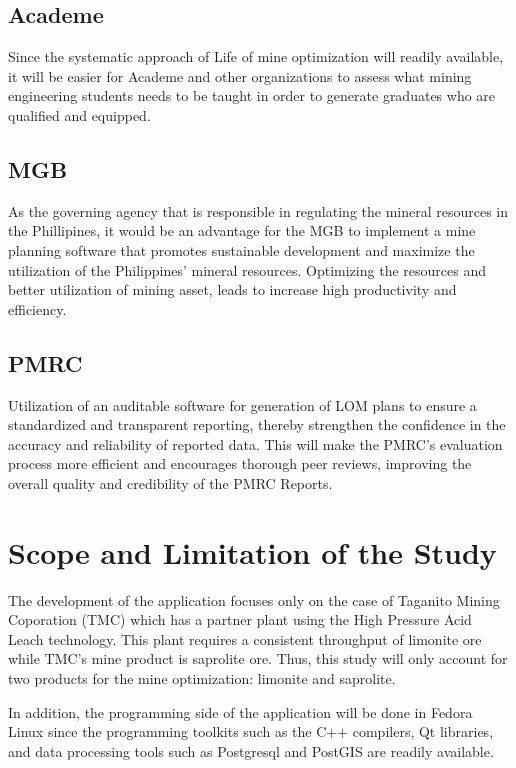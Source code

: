 \documentclass[12pt]{report}
\begin{document}
\subsection{Academe}

Since the systematic approach of Life of mine optimization will readily available, it will be easier for Academe and other organizations to assess what mining engineering students needs to be taught in order to generate graduates who are qualified and equipped.

\subsection{MGB}

As the governing agency that is responsible in regulating the mineral resources in the Phillipines, it would be an advantage for the MGB to implement a mine planning software that promotes sustainable development and maximize the utilization of the Philippines' mineral resources.
Optimizing the resources and better utilization of mining asset, leads to increase high productivity and efficiency.

\subsection{PMRC}

Utilization of an auditable software for generation of LOM plans to ensure a standardized and transparent reporting, thereby strengthen the confidence in the accuracy and reliability of reported data.
This will make the PMRC's evaluation process more efficient and encourages thorough peer reviews, improving the overall quality and credibility of the PMRC Reports.

\section{Scope and Limitation of the Study}

The development of the application focuses only on the case of Taganito Mining Coporation (TMC) which has a partner plant using the High Pressure Acid Leach technology.
This plant requires a consistent throughput of limonite ore while TMC's mine product is saprolite ore.
Thus, this study will only account for two products for the mine optimization: limonite and saprolite.

In addition, the programming side of the application will be done in Fedora Linux \cite{fedora} since the programming toolkits such as the C++ compilers, Qt libraries, and data processing tools such as Postgresql \cite{postgres} and PostGIS \cite{postgis} are readily available.
\end{document}
